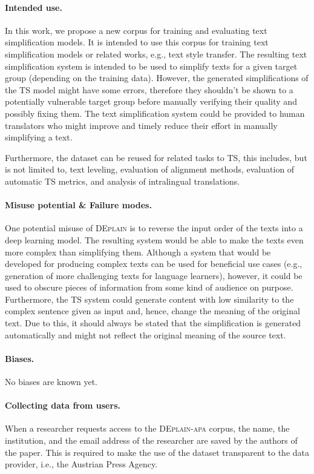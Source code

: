 \documentclass[11pt]{article}
\begin{document}
\paragraph{Intended use.}
In this work, we propose a new corpus for training and evaluating text simplification models. It is intended to use this corpus for training text simplification models or related works, e.g., text style transfer. The resulting text simplification system is intended to be used to simplify texts for a given target group (depending on the training data). However, the generated simplifications of the TS model might have some errors, therefore they shouldn't be shown to a potentially vulnerable target group before manually verifying their quality and possibly fixing them. The text simplification system could be provided to human translators who might improve and timely reduce their effort in manually simplifying a text.\par
Furthermore, the dataset can be reused for related tasks to TS, this includes, but is not limited to, text leveling, evaluation of alignment methods, evaluation of automatic TS metrics, and analysis of intralingual translations.

\paragraph{Misuse potential \& Failure modes.}
One potential misuse of \textsc{DEplain} is to reverse the input order of the texts into a deep learning model. The resulting system would be able to make the texts even more complex than simplifying them. 
Although a system that would be developed for producing complex texts can be used for beneficial use cases (e.g., generation of more challenging texts for language learners), however, it could be used to obscure pieces of information from some kind of audience on purpose.
Furthermore, the TS system could generate content with low similarity to the complex sentence given as input and, hence, change the meaning of the original text. Due to this, it should always be stated that the simplification is generated automatically and might not reflect the original meaning of the source text. 


\paragraph{Biases.}
No biases are known yet.

\paragraph{Collecting data from users.}
When a researcher requests access to the \textsc{DEplain-apa} corpus, the name, the institution, and the email address of the researcher are saved by the authors of the paper. This is required to make the use of the dataset transparent to the data provider, i.e., the Austrian Press Agency.
\end{document}
